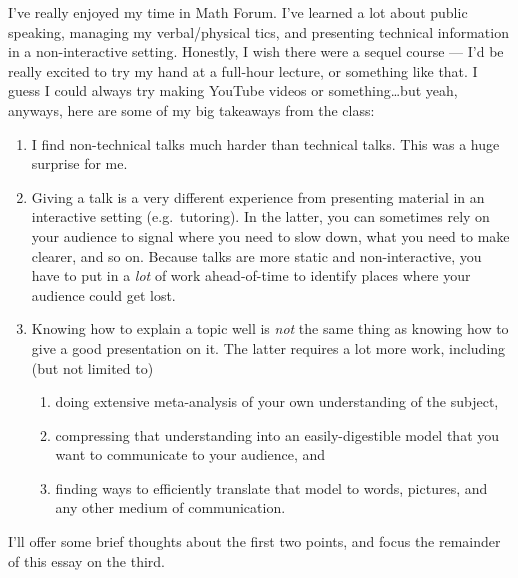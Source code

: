 \documentclass{fkpset}
\begin{document}
\begin{solution}[Response.]
  \setlength{\parindent}{2em}

  I've really enjoyed my time in Math Forum. I've learned a lot about
  public speaking, managing my verbal/physical tics, and presenting
  technical information in a non-interactive setting. Honestly, I wish
  there were a sequel course --- I'd be really excited to try my hand
  at a full-hour lecture, or something like that. I guess I could
  always try making YouTube videos or something\ldots but yeah,
  anyways, here are some of my big takeaways from the class:
  \begin{enumerate}[label=\arabic*)]
    \item I find non-technical talks much harder than technical talks.
      This was a huge surprise for me.
    \item Giving a talk is a very different experience from presenting
      material in an interactive setting (e.g.\ tutoring). In the
      latter, you can sometimes rely on your audience to signal where
      you need to slow down, what you need to make clearer, and so on.
      Because talks are more static and non-interactive, you have to
      put in a \emph{lot} of work ahead-of-time to identify places
      where your audience could get lost.
    \item Knowing how to explain a topic well is \emph{not} the same
      thing as knowing how to give a good presentation on it. The
      latter requires a lot more work, including (but not limited to)
      \begin{enumerate}
        \item doing extensive meta-analysis of your own understanding
          of the subject,
        \item compressing that understanding into an easily-digestible
          model that you want to communicate to your audience, and
        \item finding ways to efficiently translate that model to
          words, pictures, and any other medium of communication.
      \end{enumerate}
  \end{enumerate}
  I'll offer some brief thoughts about the first two points, and focus
  the remainder of this essay on the third.

\end{solution}
\end{document}
